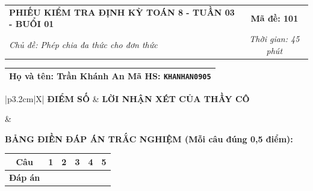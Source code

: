 \documentclass[12pt,a4paper]{article}
\begin{document}
\pagestyle{empty}



\noindent
\begin{tabularx}{\linewidth}{|X|c|}
\hline
\textbf{PHIẾU KIỂM TRA ĐỊNH KỲ TOÁN 8 - TUẦN 03 - BUỔI 01} & \textbf{Mã đề: 101} \\
\textit{Chủ đề: Phép chia đa thức cho đơn thức} & \textit{Thời gian: 45 phút} \\
\hline
\end{tabularx}

\vspace{1mm}

\noindent
\begin{tabularx}{\linewidth}{|X|}
\hline
\rule[-2mm]{0pt}{7.5mm}\textbf{Họ và tên:} \textbf{\large Trần Khánh An} \hfill \textbf{Mã HS:} \texttt{KHANHAN0905} \quad \\
\hline
\end{tabularx}

\vspace{1mm}

\noindent
\begin{tabularx}{\linewidth}{|p{3.2cm}|X|}
\hline
\centering\textbf{ĐIỂM SỐ} & \centering\textbf{LỜI NHẬN XÉT CỦA THẦY CÔ} \tabularnewline
\hline
\rule{0pt}{1.3cm} & \tabularnewline
\hline
\end{tabularx}

\vspace{1.2mm}

\noindent\textbf{BẢNG ĐIỀN ĐÁP ÁN TRẮC NGHIỆM (Mỗi câu đúng 0,5 điểm):}
\vspace{0.8mm}

\noindent
\renewcommand{\arraystretch}{1.35}
\begin{tabularx}{\linewidth}{|c|*{5}{>{\centering\arraybackslash}X|}}
\hline
\textbf{Câu} & \textbf{1} & \textbf{2} & \textbf{3} & \textbf{4} & \textbf{5} \\
\hline
\textbf{Đáp án} & & & & & \\
\hline
\end{tabularx}
\renewcommand{\arraystretch}{1.0}

\vspace{1.5mm}
\end{document}
